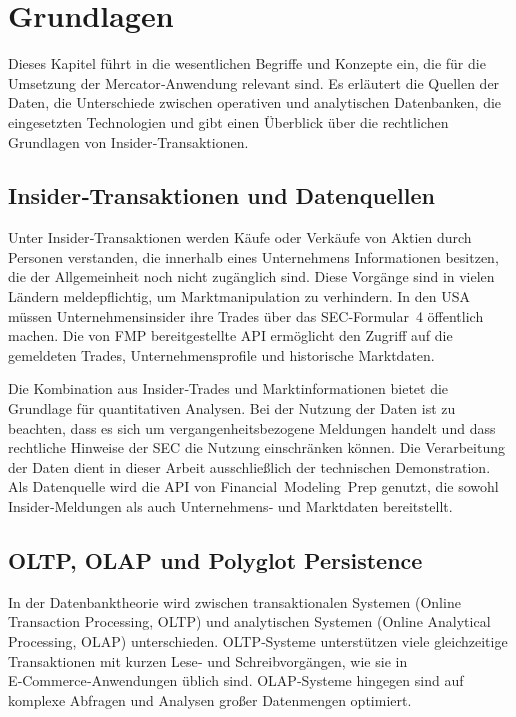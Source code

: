 \section{Grundlagen}
\label{sec:grundlagen}

Dieses Kapitel führt in die wesentlichen Begriffe und Konzepte ein, die für die Umsetzung der Mercator‑Anwendung relevant sind. Es erläutert die Quellen der Daten, die Unterschiede zwischen operativen und analytischen Datenbanken, die eingesetzten Technologien und gibt einen Überblick über die rechtlichen Grundlagen von Insider‑Transaktionen.

\subsection{Insider‑Transaktionen und Datenquellen}

Unter Insider‑Transaktionen werden Käufe oder Verkäufe von Aktien durch Personen verstanden, die innerhalb eines Unternehmens Informationen besitzen, die der Allgemeinheit noch nicht zugänglich sind. Diese Vorgänge sind in vielen Ländern meldepflichtig, um Marktmanipulation zu verhindern. In den USA müssen Unternehmensinsider ihre Trades über das SEC‑Formular~4 öffentlich machen. Die von FMP bereitgestellte API ermöglicht den Zugriff auf die gemeldeten Trades, Unternehmensprofile und historische Marktdaten.

Die Kombination aus Insider‑Trades und Marktinformationen bietet die Grundlage für quantitativen Analysen. Bei der Nutzung der Daten ist zu beachten, dass es sich um vergangenheitsbezogene Meldungen handelt und dass rechtliche Hinweise der SEC die Nutzung einschränken können. Die Verarbeitung der Daten dient in dieser Arbeit ausschließlich der technischen Demonstration. Als Datenquelle wird die API von Financial Modeling Prep genutzt\cite{fmp_api}, die sowohl Insider‑Meldungen als auch Unternehmens‑ und Marktdaten bereitstellt.

\subsection{OLTP, OLAP und Polyglot Persistence}

In der Datenbanktheorie wird zwischen transaktionalen Systemen (Online Transaction Processing, OLTP) und analytischen Systemen (Online Analytical Processing, OLAP) unterschieden. OLTP‑Systeme unterstützen viele gleichzeitige Transaktionen mit kurzen Lese‑ und Schreibvorgängen, wie sie in E‑Commerce‑Anwendungen üblich sind. OLAP‑Systeme hingegen sind auf komplexe Abfragen und Analysen großer Datenmengen optimiert.

